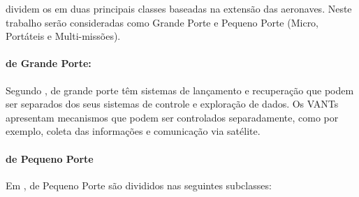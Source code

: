 \cite{Drew2005} dividem os \vants em duas principais classes baseadas na extensão das aeronaves. Neste trabalho serão consideradas como Grande Porte e Pequeno Porte (Micro, Portáteis e Multi-missões).


\addtocounter{footnote}{1}

\paragraph{\vants de Grande Porte:}
Segundo \cite{Drew2005}, \vants de grande porte têm sistemas de lançamento e recuperação que podem ser separados dos seus sistemas de controle e exploração de dados. Os VANTs apresentam mecanismos que podem ser controlados separadamente, como por exemplo, coleta das informações e comunicação via satélite.


\paragraph{\vants de Pequeno Porte}

Em \cite{Drew2005}, \vants de Pequeno Porte são divididos nas seguintes subclasses:


